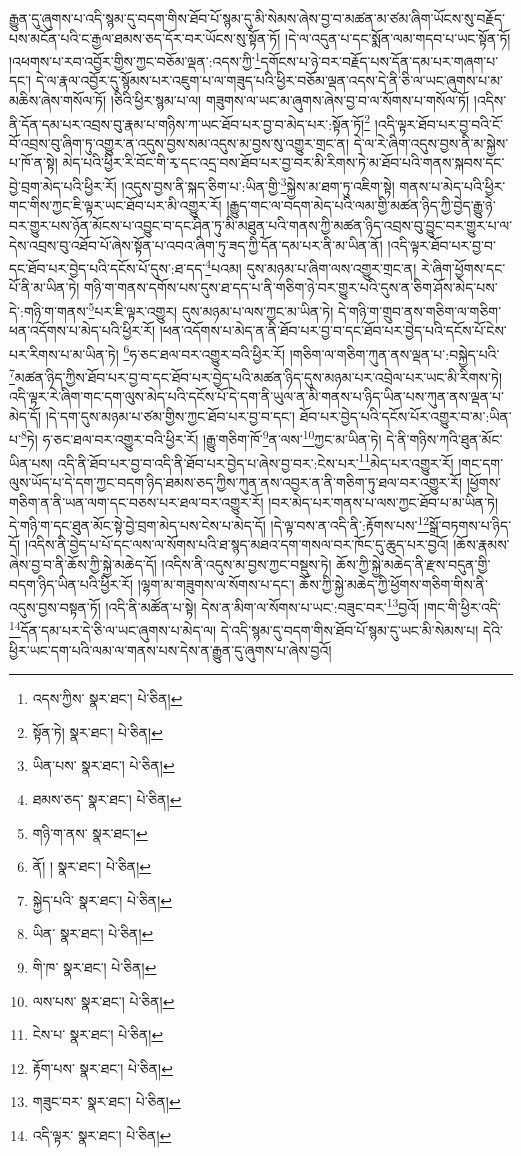རྒྱུན་དུ་ཞུགས་པ་འདི་སྙམ་དུ་བདག་གིས་ཐོབ་པོ་སྙམ་དུ་མི་སེམས་ཞེས་བྱ་བ་མཚན་མ་ཙམ་ཞིག་ཡོངས་སུ་བརྗོད་པས་མངོན་པའི་ང་རྒྱལ་ཐམས་ཅད་དོར་བར་ཡོངས་སུ་སྟོན་ཏོ། །དེ་ལ་འདུན་པ་དང་སྨོན་ལམ་གདབ་པ་ཡང་སྟོན་ཏོ། །འཕགས་པ་རབ་འབྱོར་གྱིས་ཀྱང་བཅོམ་ལྡན་:འདས་ཀྱི་\footnote{འདས་ཀྱིས་  སྣར་ཐང་།  པེ་ཅིན། }དགོངས་པ་ཉེ་བར་བརྗོད་པས་དོན་དམ་པར་གཞག་པ་དང་། དེ་ལ་རྣལ་འབྱོར་དུ་སྙོམས་པར་འཇུག་པ་ལ་གཟུད་པའི་ཕྱིར་བཅོམ་ལྡན་འདས་དེ་ནི་ཅི་ལ་ཡང་ཞུགས་པ་མ་མཆིས་ཞེས་གསོལ་ཏོ། །ཅིའི་ཕྱིར་སྙམ་པ་ལ། གཟུགས་ལ་ཡང་མ་ཞུགས་ཞེས་བྱ་བ་ལ་སོགས་པ་གསོལ་ཏོ། །འདིས་ནི་དོན་དམ་པར་འབྲས་བུ་རྣམ་པ་གཉིས་ཀ་ཡང་ཐོབ་པར་བྱ་བ་མེད་པར་:སྟོན་ཏོ།\footnote{སྟོན་ཏེ།  སྣར་ཐང་།  པེ་ཅིན། } །འདི་ལྟར་ཐོབ་པར་བྱ་བའི་ངོ་བོ་འབྲས་བུ་ཞིག་ཏུ་འགྱུར་ན་འདུས་བྱས་སམ་འདུས་མ་བྱས་སུ་འགྱུར་གྲང་ན། དེ་ལ་རེ་ཞིག་འདུས་བྱས་ནི་མ་སྐྱེས་པ་ཁོ་ན་སྟེ། མེད་པའི་ཕྱིར་རི་བོང་གི་རྭ་དང་འདྲ་བས་ཐོབ་པར་བྱ་བར་མི་རིགས་ཏེ་མ་ཐོབ་པའི་གནས་སྐབས་དང་བྱེ་བྲག་མེད་པའི་ཕྱིར་རོ། །འདུས་བྱས་ནི་སྐད་ཅིག་པ་:ཡིན་གྱི་\footnote{ཡིན་པས་  སྣར་ཐང་།  པེ་ཅིན། }སྐྱེས་མ་ཐག་ཏུ་འཇིག་སྟེ། གནས་པ་མེད་པའི་ཕྱིར་གང་གིས་ཀྱང་ཇི་ལྟར་ཡང་ཐོབ་པར་མི་འགྱུར་རོ། །རྒྱུད་གང་ལ་བདག་མེད་པའི་ལམ་གྱི་མཚན་ཉིད་ཀྱི་བྱེད་རྒྱུ་ཉེ་བར་གྱུར་པས་ཉོན་མོངས་པ་འབྱུང་བ་དང་ཤིན་ཏུ་མི་མཐུན་པའི་གནས་ཀྱི་མཚན་ཉིད་འབྲས་བུ་བྱུང་བར་གྱུར་པ་ལ་དེས་འབྲས་བུ་འཐོབ་པོ་ཞེས་སྟོན་པ་འབའ་ཞིག་ཏུ་ཟད་ཀྱི་དོན་དམ་པར་ནི་མ་ཡིན་ནོ། །འདི་ལྟར་ཐོབ་པར་བྱ་བ་དང་ཐོབ་པར་བྱེད་པའི་དངོས་པོ་དུས་:ཐ་དད་\footnote{ཐམས་ཅད་  སྣར་ཐང་།  པེ་ཅིན། }པའམ། དུས་མཉམ་པ་ཞིག་ལས་འགྱུར་གྲང་ན། རེ་ཞིག་ཕྱོགས་དང་པོ་ནི་མ་ཡིན་ཏེ། གཉི་ག་གནས་དགོས་པས་དུས་ཐ་དད་པ་ནི་གཅིག་ཉེ་བར་གྱུར་པའི་དུས་ན་ཅིག་ཤོས་མེད་པས་དེ་:གཉི་ག་གནས་\footnote{གཉི་ག་ནས་  སྣར་ཐང་། }པར་ཇི་ལྟར་འགྱུར། དུས་མཉམ་པ་ལས་ཀྱང་མ་ཡིན་ཏེ། དེ་གཉི་ག་གྲུབ་ནས་གཅིག་ལ་གཅིག་ཕན་འདོགས་པ་མེད་པའི་ཕྱིར་རོ། །ཕན་འདོགས་པ་མེད་ན་ནི་ཐོབ་པར་བྱ་བ་དང་ཐོབ་པར་བྱེད་པའི་དངོས་པོ་ངེས་པར་རིགས་པ་མ་ཡིན་ཏེ། \footnote{ནོ། །   སྣར་ཐང་།  པེ་ཅིན། }ཧ་ཅང་ཐལ་བར་འགྱུར་བའི་ཕྱིར་རོ། །གཅིག་ལ་གཅིག་ཀུན་ནས་ལྡན་པ་:བསྐྱེད་པའི་\footnote{སྐྱེད་པའི་  སྣར་ཐང་།  པེ་ཅིན། }མཚན་ཉིད་ཀྱིས་ཐོབ་པར་བྱ་བ་དང་ཐོབ་པར་བྱེད་པའི་མཚན་ཉིད་དུས་མཉམ་པར་འབྲེལ་པར་ཡང་མི་རིགས་ཏེ། འདི་ལྟར་རེ་ཞིག་གང་དག་ལུས་མེད་པའི་དངོས་པོ་དེ་དག་ནི་ཡུལ་ན་མི་གནས་པ་ཉིད་ཡིན་པས་ཀུན་ནས་ལྡན་པ་མེད་དོ། །དེ་དག་དུས་མཉམ་པ་ཙམ་གྱིས་ཀྱང་ཐོབ་པར་བྱ་བ་དང་། ཐོབ་པར་བྱེད་པའི་དངོས་པོར་འགྱུར་བ་མ་:ཡིན་པ་\footnote{ཡིན་  སྣར་ཐང་།  པེ་ཅིན། }ཏེ། ཧ་ཅང་ཐལ་བར་འགྱུར་བའི་ཕྱིར་རོ། །རྒྱུ་གཅིག་ཁོ་\footnote{གི་ཁ་  སྣར་ཐང་།  པེ་ཅིན། }ན་ལས་\footnote{ལས་པས་  སྣར་ཐང་།  པེ་ཅིན། }ཀྱང་མ་ཡིན་ཏེ། དེ་ནི་གཉིས་ཀའི་ཐུན་མོང་ཡིན་པས། འདི་ནི་ཐོབ་པར་བྱ་བ་འདི་ནི་ཐོབ་པར་བྱེད་པ་ཞེས་བྱ་བར་:ངེས་པར་\footnote{ངེས་པ་  སྣར་ཐང་།  པེ་ཅིན། }མེད་པར་འགྱུར་རོ། །གང་དག་ལུས་ཡོད་པ་དེ་དག་ཀྱང་བདག་ཉིད་ཐམས་ཅད་ཀྱིས་ཀུན་ནས་འབྱར་ན་ནི་གཅིག་ཏུ་ཐལ་བར་འགྱུར་རོ། །ཕྱོགས་གཅིག་ན་ནི་ཡན་ལག་དང་བཅས་པར་ཐལ་བར་འགྱུར་རོ། །བར་མེད་པར་གནས་པ་ལས་ཀྱང་ཐོབ་པ་མ་ཡིན་ཏེ། དེ་གཉི་ག་དང་ཐུན་མོང་སྟེ་བྱེ་བྲག་མེད་པས་ངེས་པ་མེད་དོ། །དེ་ལྟ་བས་ན་འདི་ནི་:རྟོགས་པས་\footnote{རྟོག་པས་  སྣར་ཐང་།  པེ་ཅིན། }སྒྲོ་བཏགས་པ་ཉིད་དོ། །འདིས་ནི་བྱེད་པ་པོ་དང་ལས་ལ་སོགས་པའི་ཐ་སྙད་མཐའ་དག་གསལ་བར་ཁོང་དུ་ཆུད་པར་བྱའོ། །ཆོས་རྣམས་ཞེས་བྱ་བ་ནི་ཆོས་ཀྱི་སྐྱེ་མཆེད་དོ། །འདིས་ནི་འདུས་མ་བྱས་ཀྱང་བསྡུས་ཏེ། ཆོས་ཀྱི་སྐྱེ་མཆེད་ནི་རྫས་བདུན་གྱི་བདག་ཉིད་ཡིན་པའི་ཕྱིར་རོ། །ལྷག་མ་གཟུགས་ལ་སོགས་པ་དང་། ཆོས་ཀྱི་སྐྱེ་མཆེད་ཀྱི་ཕྱོགས་གཅིག་གིས་ནི་འདུས་བྱས་བསྟན་ཏོ། །འདི་ནི་མཚོན་པ་སྟེ། དེས་ན་མིག་ལ་སོགས་པ་ཡང་:བཟུང་བར་\footnote{གཟུང་བར་  སྣར་ཐང་།  པེ་ཅིན། }བྱའོ། །གང་གི་ཕྱིར་འདི་\footnote{འདི་ལྟར་  སྣར་ཐང་།  པེ་ཅིན། }དོན་དམ་པར་དེ་ཅི་ལ་ཡང་ཞུགས་པ་མེད་ལ། དེ་འདི་སྙམ་དུ་བདག་གིས་ཐོབ་པོ་སྙམ་དུ་ཡང་མི་སེམས་པ། དེའི་ཕྱིར་ཡང་དག་པའི་ལམ་ལ་གནས་པས་དེས་ན་རྒྱུན་དུ་ཞུགས་པ་ཞེས་བྱའོ། 
